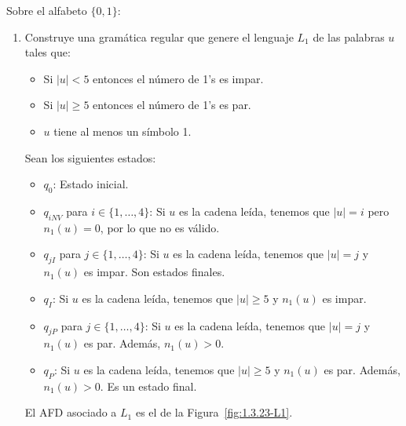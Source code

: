 \begin{ejercicio}\label{ej:1.3.23}
    Sobre el alfabeto $\{0,1\}$:
    \begin{enumerate}
        \item Construye una gramática regular que genere el lenguaje $L_1$ de las palabras $u$ tales que:
            \begin{itemize}
                \item Si $|u|< 5$ entonces el número de 1's es impar.
                \item Si $|u|\geq 5$ entonces el número de 1's es par.
                \item $u$ tiene al menos un símbolo 1.
            \end{itemize}
            
            
            Sean los siguientes estados:
            \begin{itemize}
                \item $q_0$: Estado inicial.
                \item $q_{iNV}$ para $i\in \{1,\dots,4\}$: Si $u$ es la cadena leída, tenemos que $|u|=i$ pero $n_1(u)=0$, por lo que no es válido.
                \item $q_{jI}$ para $j\in \{1,\dots,4\}$: Si $u$ es la cadena leída, tenemos que $|u|=j$ y $n_1(u)$ es impar. Son estados finales.
                \item $q_I$: Si $u$ es la cadena leída, tenemos que $|u|\geq 5$ y $n_1(u)$ es impar.
                \item $q_{jP}$ para $j\in \{1,\dots,4\}$: Si $u$ es la cadena leída, tenemos que $|u|=j$ y $n_1(u)$ es par. Además, $n_1(u)>0$.
                \item $q_P$: Si $u$ es la cadena leída, tenemos que $|u|\geq 5$ y $n_1(u)$ es par. Además, $n_1(u)>0$. Es un estado final.
            \end{itemize}

            El AFD asociado a $L_1$ es el de la Figura~\ref{fig:1.3.23-L1}.
            \begin{figure}
                \centering
\end{figure}
\end{enumerate}
\end{ejercicio}
